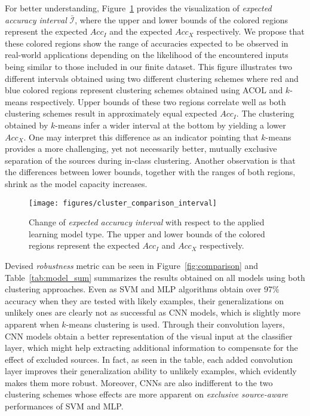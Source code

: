 \documentclass[letterpaper]{article}
\begin{document}
For better understanding, Figure~\ref{fig:comparison_interval} provides the visualization of \textit{expected accuracy interval} $\bar{\mathcal{I}}$, where the upper and lower bounds of the colored regions represent the expected $Acc_I$ and the expected $Acc_X$ respectively. We propose that these colored regions show the range of accuracies expected to be observed in real-world applications depending on the likelihood of the encountered inputs being similar to those included in our finite dataset. This figure illustrates two different intervals obtained using two different clustering schemes where red and blue colored regions represent clustering schemes obtained using ACOL and $k$-means respectively. Upper bounds of these two regions correlate well as both clustering schemes result in approximately equal expected $Acc_I$. The clustering obtained by $k$-means infer a wider interval at the bottom by yielding a lower $Acc_X$. One may interpret this difference as an indicator pointing that $k$-means provides a more challenging, yet not necessarily better, mutually exclusive separation of the sources during in-class clustering. Another observation is that the differences between lower bounds, together with the ranges of both regions, shrink as the model capacity increases.   

\begin{figure}[ht]
	\begin{center}
		\vskip 0.1in
		\centerline{\texttt{[image: figures/cluster\_comparison\_interval]}}
		\caption{Change of \textit{expected accuracy interval} with respect to the applied learning model type. The upper and lower bounds of the colored regions represent the expected $Acc_I$ and $Acc_X$ respectively.}
		\label{fig:comparison_interval}
	\end{center}
	\vskip -0.3in
\end{figure}

Devised \textit{robustness} metric can be seen in Figure~\ref{fig:comparison} and Table~\ref{tab:model_sum} summarizes the results obtained on all models using both clustering approaches. Even as SVM and MLP algorithms obtain over 97\% accuracy when they are tested with likely examples, their generalizations on unlikely ones are clearly not as successful as CNN models, which is slightly more apparent when $k$-means clustering is used. Through their convolution layers, CNN models obtain a better representation of the visual input at the classifier layer, which might help extracting additional information to compensate for the effect of excluded sources. In fact, as seen in the table, each added convolution layer improves their generalization ability to unlikely examples, which evidently makes them more robust. Moreover, CNNs are also indifferent to the two clustering schemes whose effects are more apparent on \textit{exclusive source-aware} performances of SVM and MLP.
\end{document}
